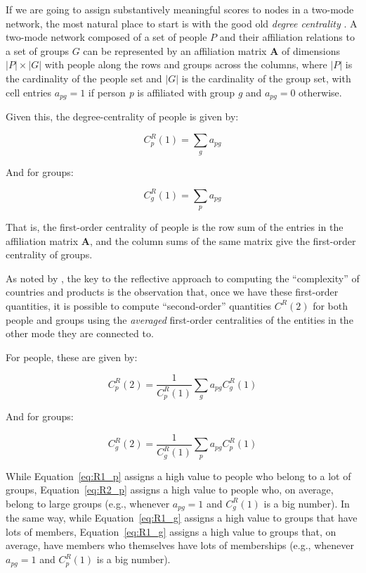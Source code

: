 \documentclass[a4paper,fleqn]{cas-sc}
\begin{document}
If we are going to assign substantively meaningful scores to nodes in a two-mode network, the most natural place to start is with the good old \textit{degree centrality} \citep{faust1997centrality}. A two-mode network composed of a set of people $P$ and their affiliation relations to a set of groups $G$ can be represented by an affiliation matrix $\mathbf{A}$ of dimensions $|P| \times |G|$ with people along the rows and groups across the columns, where $|P|$ is the cardinality of the people set and $|G|$ is the cardinality of the group set, with cell entries $a_{pg}= 1$ if person \textit{p} is affiliated with group \textit{g} and $a_{pg}= 0$ otherwise. 

Given this, the degree-centrality of people is given by:

\begin{equation}
    C^R_p(1) = \sum_g a_{pg}
    \label{eq:R1_p}
\end{equation}

And for groups:

\begin{equation}
   C^R_g(1) = \sum_p a_{pg}
  \label{eq:R1_g}
\end{equation}

That is, the first-order centrality of people is the row sum of the entries in the affiliation matrix $\mathbf{A}$, and the column sums of the same matrix give the first-order centrality of groups. 

As noted by \citet{hidalgo2009building}, the key to the reflective approach to computing the ``complexity'' of countries and products is the observation that, once we have these first-order quantities, it is possible to compute ``second-order'' quantities $C^R(2)$ for both people and groups using the \textit{averaged} first-order centralities of the entities in the other mode they are connected to. 

For people, these are given by:

\begin{equation}
    C^R_p(2) = \frac{1}{C^R_p(1)}\sum_g a_{pg}C^R_g(1)
    \label{eq:R2_p}
\end{equation}

And for groups:

\begin{equation}
   C^R_g(2) = \frac{1}{C^R_g(1)}\sum_p a_{pg}C^R_p(1)
    \label{eq:R2_g}
\end{equation}

While Equation~\ref{eq:R1_p} assigns a high value to people who belong to a lot of groups, Equation~\ref{eq:R2_p} assigns a high value to people who, on average, belong to large groups (e.g., whenever $a_{pg} = 1$ and $C^R_g(1)$ is a big number). In the same way, while Equation~\ref{eq:R1_g} assigns a high value to groups that have lots of members, Equation~\ref{eq:R1_g} assigns a high value to groups that, on average, have members who themselves have lots of memberships (e.g., whenever $a_{pg} = 1$ and $C^R_p(1)$ is a big number). 
\end{document}
